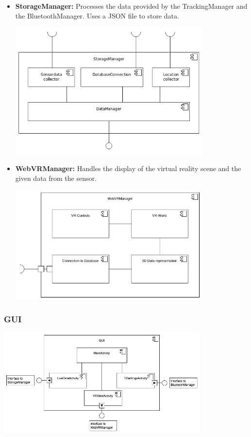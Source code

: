 \begin{itemize}
  \item \textbf{StorageManager:} Processes the data provided by the TrackingManager and the BluetoothManager. Uses a JSON file to store data.

 \includegraphics[width=0.8\textwidth]{pics/StorageMgr_Composition.png}

  \item \textbf{WebVRManager:} Handles the display of the virtual reality scene and the given data from the sensor.

 \includegraphics[width=0.8\textwidth]{pics/WebVRManager.png}

\end{itemize}

\subsubsection{GUI}

\includegraphics[width=0.8\textwidth]{pics/GUI.png}

